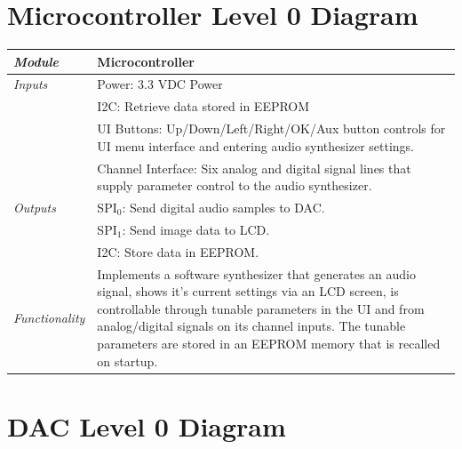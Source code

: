 \documentclass{article}
\begin{document}
\section{Microcontroller Level 0 Diagram}

\begin{tabular}{|p{1in}|p{5in}|}
\hline
\emph{Module} & Microcontroller \\
\hline
\emph{Inputs}& Power: 3.3 VDC Power\\
	     & I2C: Retrieve data stored in EEPROM\\
	     & UI Buttons: Up/Down/Left/Right/OK/Aux button controls for UI menu interface and entering audio synthesizer settings.\\
	     & Channel Interface: Six analog and digital signal lines that supply parameter control to the audio synthesizer.\\
\hline
\emph{Outputs}& SPI$_0$: Send digital audio samples to DAC.\\
	      & SPI$_1$: Send image data to LCD.\\
	      & I2C: Store data in EEPROM.\\ 
\hline
\emph{Functionality}& Implements a software synthesizer that generates an audio signal, shows it's current settings via an LCD screen, is controllable through tunable parameters in the UI and from analog/digital signals on its channel inputs. The tunable parameters are stored in an EEPROM memory that is recalled on startup.\\
\hline
\end{tabular}

\section{DAC Level 0 Diagram}
\end{document}
